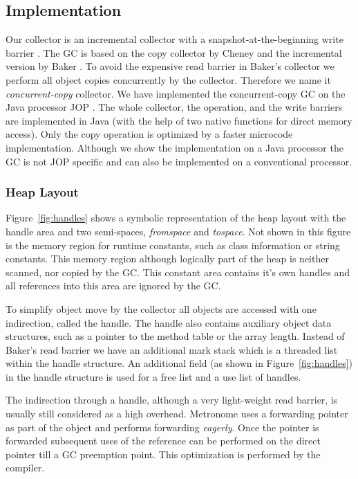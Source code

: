 \subsection{Implementation}

Our collector is an incremental collector with a
snapshot-at-the-beginning write barrier \cite{gc:yuasa90}. The GC is
based on the copy collector by Cheney \cite{gc:cheney70} and the
incremental version by Baker \cite{gc:baker78}. To avoid the
expensive read barrier in Baker's collector we perform all object
copies concurrently by the collector. Therefore we name it
\emph{concurrent-copy} collector. We have implemented the
concurrent-copy GC on the Java processor JOP \cite{jop:thesis,
jop:jnl:jsa2007}. The whole collector, the  operation, and
the write barriers are implemented in Java (with the help of two
native functions for direct memory access). Only the copy operation
is optimized by a faster microcode implementation. Although we show
the implementation on a Java processor the GC is not JOP specific
and can also be implemented on a conventional processor.

\subsubsection{Heap Layout}

Figure~\ref{fig:handles} shows a symbolic representation of the heap
layout with the handle area and two semi-spaces, \emph{fromspace} and
\emph{tospace}. Not shown in this figure is the memory region for
runtime constants, such as class information or string constants.
This memory region although logically part of the heap is neither
scanned, nor copied by the GC. This constant area contains it's own
handles and all references into this area are ignored by the GC.

To simplify object move by the collector all objects are accessed
with one indirection, called the handle. The handle also contains
auxiliary object data structures, such as a pointer to the method
table or the array length. Instead of Baker's read barrier we have
an additional mark stack which is a threaded list within the handle
structure. An additional field (as shown in
Figure~\ref{fig:handles}) in the handle structure is used for a free
list and a use list of handles.

The indirection through a handle, although a very light-weight read
barrier, is usually still considered as a high overhead. \linebreak
Metronome \cite{Bacon03} uses a forwarding pointer as part of the
object and performs forwarding \emph{eagerly}. Once the pointer is
forwarded subsequent uses of the reference can be performed on the
direct pointer till a GC preemption point. This optimization is
performed by the compiler.

